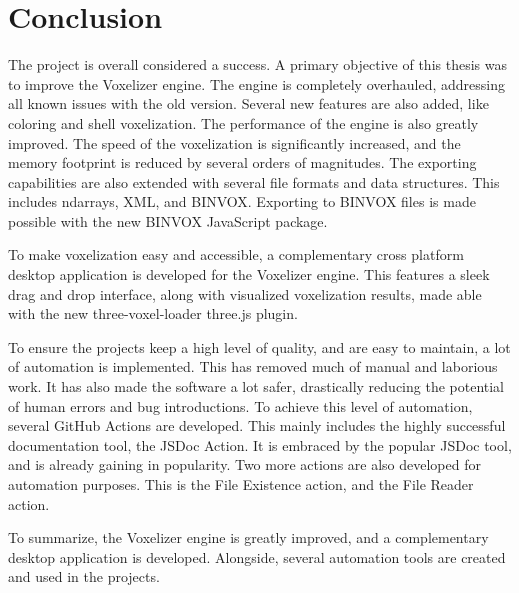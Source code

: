 \chapter{Conclusion}
The project is overall considered a success. A primary objective of this thesis was to improve the Voxelizer engine. The engine is completely overhauled, addressing all known issues with the old version. Several new features are also added, like coloring and shell voxelization. The performance of the engine is also greatly improved. The speed of the voxelization is significantly increased, and the memory footprint is reduced by several orders of magnitudes. The exporting capabilities are also extended with several file formats and data structures. This includes ndarrays, XML, and BINVOX. Exporting to BINVOX files is made possible with the new BINVOX JavaScript package.

To make voxelization easy and accessible, a complementary cross platform desktop application is developed for the Voxelizer engine. This features a sleek drag and drop interface, along with visualized voxelization results, made able with the new three-voxel-loader three.js plugin.

To ensure the projects keep a high level of quality, and are easy to maintain, a lot of automation is implemented. This has removed much of manual and laborious work. It has also made the software a lot safer, drastically reducing the potential of human errors and bug introductions. To achieve this level of automation, several GitHub Actions are developed. This mainly includes the highly successful documentation tool, the JSDoc Action. It is embraced by the popular JSDoc tool, and is already gaining in popularity. Two more actions are also developed for automation purposes. This is the File Existence action, and the File Reader action.   

To summarize, the Voxelizer engine is greatly improved, and a complementary desktop application is developed. Alongside, several automation tools are created and used in the projects.